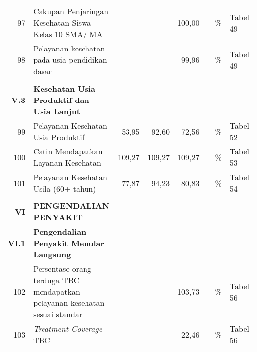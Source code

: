 \begin{small}
\begin{longtable}{rY{12em}rrrrY{5em}Y{5em}}
	 97 & Cakupan Penjaringan Kesehatan Siswa Kelas 10 SMA/ MA                        &        &        &             100,00 &          & \%                             & Tabel 49 \\
	 98 & Pelayanan kesehatan pada usia pendidikan dasar                              &        &        &              99,96 &          & \%                             & Tabel 49 \\
	 &                                                                                &        &        &                    &          &                                &          \\
	\textbf{V.3} & \textbf{Kesehatan Usia Produktif dan Usia Lanjut}                  &        &        &                    &          &                                &          \\
	 99 & Pelayanan Kesehatan Usia Produktif                                          &  53,95 &  92,60 &              72,56 &          & \%                             & Tabel 52 \\
	100 & Catin Mendapatkan Layanan Kesehatan                                         & 109,27 & 109,27 &             109,27 &          & \%                             & Tabel 53 \\
	101 & Pelayanan Kesehatan Usila (60+ tahun)                                       &  77,87 &  94,23 &              80,83 &          & \%                             & Tabel 54 \\
	&                                                                                 &        &        &                    &          &                                &          \\
	\textbf{VI} & \textbf{PENGENDALIAN PENYAKIT}                                      &        &        &                    &          &                                &          \\
	\textbf{VI.1} & \textbf{Pengendalian Penyakit Menular Langsung}                   &        &        &                    &          &                                &          \\
	102 & Persentase orang terduga TBC mendapatkan pelayanan kesehatan sesuai standar &        &        &             103,73 &          & \%                             & Tabel 56 \\
	103 & \emph{Treatment Coverage} TBC                                               &        &        &              22,46 &          & \%                             & Tabel 56 \\

\end{longtable}
\end{small}
